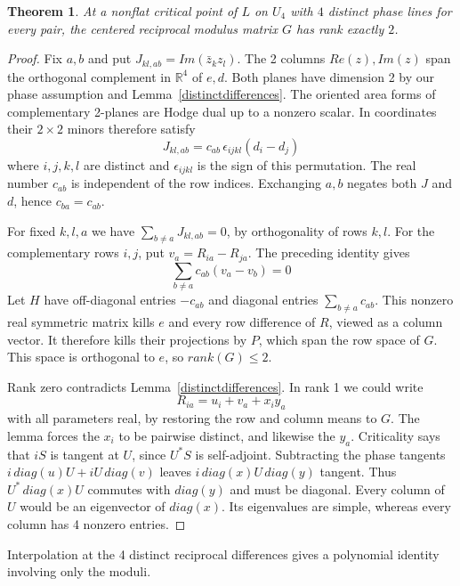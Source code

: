 \documentclass[11pt,a4paper]{article}
\newtheorem{thm}{Theorem}[section]
\begin{document}
\begin{thm}\label{reciprocalrank}
At a nonflat critical point of $L$ on $U_4$ with $4$ distinct phase
lines for every pair, the centered reciprocal modulus matrix $G$ has
rank exactly $2$.
\end{thm}
\begin{proof}
Fix $a,b$ and put $J_{kl,ab}=Im(\bar z_k z_l)$.
The 2 columns $Re(z),Im(z)$ span the
orthogonal complement in $\mathbb R^4$ of $e,d$. Both planes have
dimension 2 by our phase assumption and Lemma~\ref{distinctdifferences}.
The oriented area forms of complementary 2-planes are Hodge dual up
to a nonzero scalar. In coordinates their $2\times2$ minors therefore
satisfy
\[
 J_{kl,ab}=c_{ab}\,\epsilon_{ijkl}(d_i-d_j)
\]
where $i,j,k,l$ are distinct and $\epsilon_{ijkl}$ is the sign of this
permutation. The real number $c_{ab}$ is independent of the row indices.
Exchanging $a,b$ negates both $J$ and $d$, hence $c_{ba}=c_{ab}$.

For fixed $k,l,a$ we have $\sum_{b\ne a}J_{kl,ab}=0$, by orthogonality of
rows $k,l$. For the complementary rows $i,j$, put $v_a=R_{ia}-R_{ja}$.
The preceding identity gives
\[
 \sum_{b\ne a} c_{ab}(v_a-v_b)=0
\]
Let $H$ have off-diagonal entries $-c_{ab}$ and diagonal entries
$\sum_{b\ne a}c_{ab}$. This nonzero real symmetric matrix kills
$e$ and every row difference of $R$, viewed as a column vector.
It therefore kills their projections by $P$, which span the row space
of $G$. This space is orthogonal to $e$, so $rank(G)\le2$.

Rank zero contradicts Lemma~\ref{distinctdifferences}. In rank 1 we
could write
\[
 R_{ia}=u_i+v_a+x_i y_a
\]
with all parameters real, by restoring the row and column means to $G$.
The lemma forces the $x_i$ to be pairwise distinct, and likewise the $y_a$.
Criticality says that $iS$ is tangent at $U$, since $U^*S$ is self-adjoint.
Subtracting the phase tangents $i\,diag(u)U+iU\,diag(v)$ leaves
$i\,diag(x)U\,diag(y)$ tangent. Thus $U^*\,diag(x)U$ commutes with
$diag(y)$ and must be diagonal. Every column of $U$ would be an
eigenvector of $diag(x)$. Its eigenvalues are simple, whereas every
column has 4 nonzero entries.
\end{proof}

Interpolation at the 4 distinct reciprocal differences gives a
polynomial identity involving only the moduli.
\end{document}
